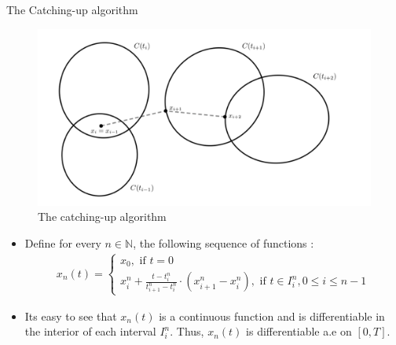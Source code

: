 \documentclass[8pt,aspectratio=169]{beamer}
\begin{document}
\begin{frame}{The Catching-up algorithm}
    \begin{figure}
        \centering
        \includegraphics[width=0.35\linewidth]{catch_up.png}
        \caption{The catching-up algorithm}
        \label{fig:enter-label}
    \end{figure}
    \begin{itemize}
        \item Define for every $n \in \mathbb{N}$, the following sequence of functions : 
            \begin{align*}
                x_n(t) = \begin{cases}
                x_0, \text{ if } t = 0\\
                x_i^n + \frac{t - t_i^n}{t_{i+1}^n - t_i^n}\cdot (x_{i+1}^n - x_i^n), \text{ if } t \in I_i^n,  0\leq i \leq n-1
                \end{cases}
            \end{align*}
        \item Its easy to see that $x_n(t)$ is a continuous function and is differentiable in the interior of each interval $I_i^n$. Thus, $x_n(t)$ is differentiable a.e on $[0, T]$.
    \end{itemize}
\end{frame}
\end{document}
